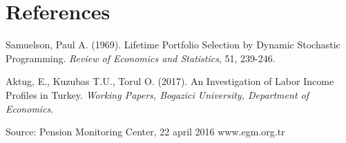 \chapter*{References}

\begin{description}

\item Samuelson, Paul A. (1969). Lifetime Portfolio Selection by Dynamic Stochastic Programming. \textit{Review of Economics and Statistics}, 51, 239-246.
 
\item Aktug, E., Kuzubas T.U., Torul O. (2017). An Investigation of Labor Income Profiles in Turkey. \textit{Working Papers, Bogazici University, Department of Economics}.

\item Source: Pension Monitoring Center, 22 april 2016 www.egm.org.tr
\end{description}
